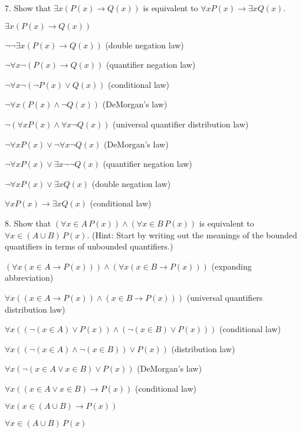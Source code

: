 \documentclass{article}
\begin{document}
\vspace{30pt}

7. Show that $\exists x (P(x) \to Q(x))$ is equivalent to $\forall x P(x) \to \exists x Q(x)$.
\vspace{30pt}

$\exists x (P(x) \to Q(x))$

$\neg \neg \exists x (P(x) \to Q(x))$ (double negation law)

$\neg \forall x \neg (P(x) \to Q(x))$ (quantifier negation law)

$\neg \forall x \neg (\neg P(x) \lor Q(x))$ (conditional law)

$\neg \forall x (P(x) \land \neg Q(x))$ (DeMorgan's law)

$\neg (\forall x P(x) \land \forall x \neg Q(x))$ (universal quantifier distribution law)

$\neg \forall x P(x) \lor \neg \forall x \neg Q(x)$ (DeMorgan's law)

$\neg \forall x P(x) \lor \exists x \neg \neg Q(x)$ (quantifier negation law)

$\neg \forall x P(x) \lor \exists x Q(x)$ (double negation law)

$\forall x P(x) \to \exists x Q(x)$ (conditional law)

\vspace{30pt}

8. Show that $(\forall x \in A \, P(x)) \land (\forall x \in B \, P(x))$ is equivalent to
$\forall x \in (A \cup B) \, P(x)$. (Hint: Start by writing out the meanings of the bounded
quantifiers in terms of unbounded quantifiers.)
\vspace{30pt}

$(\forall x (x \in A \to P(x))) \land (\forall x (x \in B \to P(x)))$ (expanding abbreviation)

$\forall x ((x \in A \to P(x)) \land (x \in B \to P(x)))$ (universal quantifiers distribution law)

$\forall x ((\neg (x \in A) \lor P(x)) \land (\neg (x \in B) \lor P(x)))$ (conditional law)

$\forall x ((\neg (x \in A) \land \neg (x \in B)) \lor P(x))$ (distribution law)

$\forall x (\neg (x \in A \lor x \in B) \lor P(x))$ (DeMorgan's law)

$\forall x ((x \in A \lor x \in B) \to P(x))$ (conditional law)

$\forall x (x \in (A \cup B) \to P(x))$

$\forall x \in (A \cup B) \, P(x)$
\end{document}
